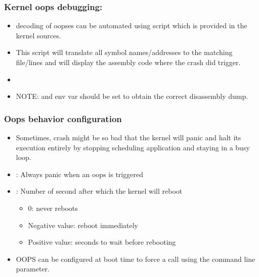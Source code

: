 \begin{frame}
  \frametitle{Kernel oops debugging: }
  \begin{itemize}
    \item {} decoding of oopses can be automated using
       script which is provided in the kernel
      sources.
    \item This script will translate all symbol names/addresses to the matching
      file/lines and will display the assembly code where the crash did trigger.
    \item {}

    \item NOTE:  and  env var should be set to
      obtain the correct disassembly dump.
  \end{itemize}
\end{frame}

\begin{frame}
  \frametitle{Oops behavior configuration}
  \begin{itemize}
    \item Sometimes, crash might be so bad that the kernel will panic and halt
          its execution entirely by stopping scheduling application and staying
          in a busy loop.
    \item {}: Always panic when an oops is
          triggered
    \item {}: Number of second after which the
          kernel will reboot
    \begin{itemize}
      \item 0: never reboots
      \item Negative value: reboot immediately
      \item Positive value: seconds to wait before rebooting
    \end{itemize}
    \item OOPS can be configured at boot time to force a  call
          using the  command line parameter.
  \end{itemize}
\end{frame}

